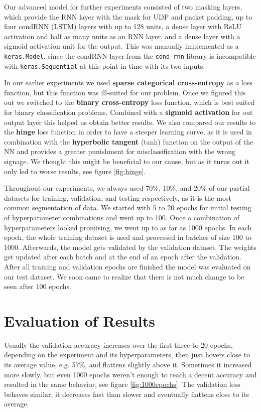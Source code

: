 \documentclass[
	ngerman,
	ruledheaders=section,%
	class=report,%
	thesis={type=bachelor},%
	accentcolor=9c,%
	custommargins=true,%
	marginpar=false,%
	parskip=half-,%
	fontsize=11pt,%
]{tudapub}
\let\code\texttt
\begin{document}
Our advanced model for further experiments consisted of two masking layers, which provide the RNN layer with the mask for UDP and packet padding,
up to four condRNN (LSTM) layers with up to 128 units,
a dense layer with ReLU activation and half as many units as an RNN layer,
and a dense layer with a sigmoid activation unit for the output.
This was manually implemented as a \code{keras.Model}, since the condRNN layer from the \code{cond-rnn} library is incompatible with \code{keras.Sequential} at this point in time with its two inputs.

In our earlier experiments we used \textbf{sparse categorical cross-entropy} as a loss function, but this function was ill-suited for our problem.
Once we figured this out we switched to the \textbf{binary cross-entropy} loss function, which is best suited for binary classification problems.
Combined with a \textbf{sigmoid activation} for out output layer this helped us obtain better results.
We also compared our results to the \textbf{hinge} loss function in order to have a steeper learning curve, as it is used in combination with the \textbf{hyperbolic tangent} (tanh) function on the output of the NN and provides a greater punishment for misclassification with the wrong signage.
We thought this might be beneficial to our cause, but as it turns out it only led to worse results, see figure \ref{fig:hinge}.

Throughout our experiments, we always used 70\%, 10\%, and 20\% of our partial datasets for training, validation, and testing respectively, as it is the most common segmentation of data.
We started with 5 to 20 epochs for initial testing of hyperparameter combinations and went up to 100.
Once a combination of hyperparameters looked promising, we went up to as far as 1000 epochs.
In each epoch, the whole training dataset is used and processed in batches of size 100 to 1000.
Afterwards, the model gets validated by the validation dataset.
The weights get updated after each batch and at the end of an epoch after the validation.
After all training and validation epochs are finished the model was evaluated on our test dataset.
We soon came to realize that there is not much change to be seen after 100 epochs.

\section{Evaluation of Results}
\label{sec:exEval}

Usually the validation accuracy increases over the first three to 20 epochs, depending on the experiment and its hyperparameters, then just hovers close to its average value, e.g. 57\%, and flattens slightly above it.
Sometimes it increased more slowly, but even 1000 epochs weren't enough to reach a decent accuracy and resulted in the same behavior, see figure \ref{fig:1000epochs}.
The validation loss behaves similar, it decreases fast than slower and eventually flattens close to its average.
\end{document}
